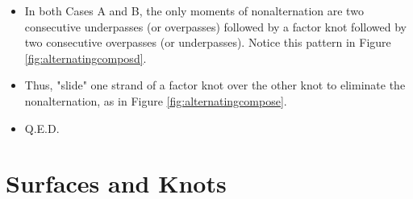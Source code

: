 \documentclass[titlepage]{article}
\numberwithin{figure}{section}
\numberwithin{table}{section}
\numberwithin{equation}{section}
\begin{document}
\begin{itemize}
\begin{itemize}
\begin{itemize}
        \end{itemize}
        \item In both Cases A and B, the only moments of nonalternation are two consecutive underpasses (or overpasses) followed by a factor knot followed by two consecutive overpasses (or underpasses). Notice this pattern in Figure \ref{fig:alternatingcomposd}.
        \item Thus, "slide" one strand of a factor knot over the other knot to eliminate the nonalternation, as in Figure \ref{fig:alternatingcompose}.
        \item Q.E.D.
    \end{itemize}
\end{itemize}
\newpage



\section{Surfaces and Knots}
\end{document}
